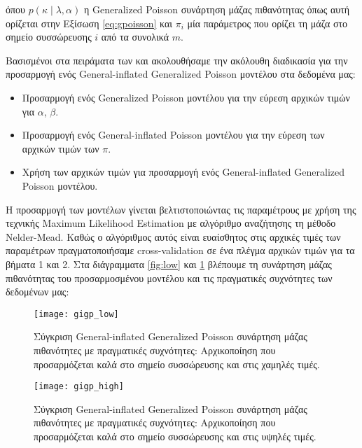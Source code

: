  όπου $p(\kappa \mid \lambda, \alpha)$ η Generalized Poisson συνάρτηση μάζας πιθανότητας όπως αυτή ορίζεται στην Εξίσωση \ref{eq:gpoisson} και $\pi_i$ μία παράμετρος που ορίζει τη μάζα στο σημείο συσσώρευσης $i$ από τα συνολικά $m$.
 
 Βασισμένοι στα πειράματα των \citep{gip} και \citep{Famoye_onthe} ακολουθήσαμε την ακόλουθη διαδικασία για την προσαρμογή ενός General-inflated Generalized Poisson μοντέλου στα δεδομένα μας:
 \begin{itemize}
 	\item Προσαρμογή ενός Generalized Poisson μοντέλου για την εύρεση αρχικών τιμών για $\alpha$, $\beta$.
 	\item Προσαρμογή ενός General-inflated Poisson μοντέλου για την εύρεση των αρχικών τιμών των $\pi$.
 	\item Χρήση των αρχικών τιμών για προσαρμογή ενός General-inflated Generalized Poisson μοντέλου.
 \end{itemize}
 
 Η προσαρμογή των μοντέλων γίνεται βελτιστοποιώντας τις παραμέτρους με χρήση της τεχνικής Maximum Likelihood Estimation με αλγόριθμο αναζήτησης τη μέθοδο Nelder-Mead. Καθώς ο αλγόριθμος αυτός είναι ευαίσθητος στις αρχικές τιμές των παραμέτρων πραγματοποιήσαμε cross-validation σε ένα πλέγμα αρχικών τιμών για τα βήματα 1 και 2. Στα διάγραμματα \ref{fig:low} και \ref{fig:high} βλέπουμε τη συνάρτηση μάζας πιθανότητας του προσαρμοσμένου μοντέλου και τις πραγματικές συχνότητες των δεδομένων μας:
 
\begin{figure}[!htb]
	\begin{minipage}{0.48\textwidth}
		\texttt{[image: gigp\_low]}
		\caption{Σύγκριση General-inflated Generalized Poisson συνάρτηση μάζας πιθανότητες με πραγματικές συχνότητες: Αρχικοποίηση που προσαρμόζεται καλά στο σημείο συσσώρευσης και στις χαμηλές τιμές.}	
		\label{fig:low}
	\end{minipage}
	\begin{minipage}{0.48\textwidth}
		\texttt{[image: gigp\_high]}
		\caption{Σύγκριση General-inflated Generalized Poisson συνάρτηση μάζας πιθανότητες με πραγματικές συχνότητες: Αρχικοποίηση που προσαρμόζεται καλά στο σημείο συσσώρευσης και στις υψηλές τιμές.}	
		\label{fig:high}
	\end{minipage}
\end{figure}
\FloatBarrier
